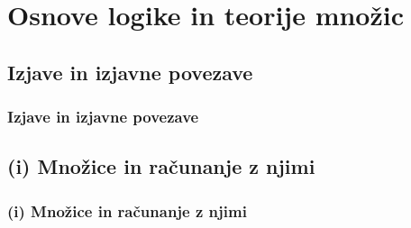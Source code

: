 \section{Osnove logike in teorije množic}

\begin{frame}
    \sectionpage
\end{frame}

\begin{frame}
\end{frame}

    \subsection{Izjave in izjavne povezave}

        \begin{frame}
            \frametitle{Izjave in izjavne povezave}
        \end{frame}

    \subsection{(i) Množice in računanje z njimi}

        \begin{frame}
            \frametitle{(i) Množice in računanje z njimi}
        \end{frame}
